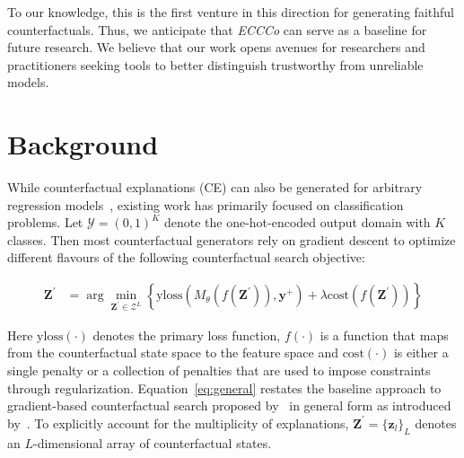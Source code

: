 To our knowledge, this is the first venture in this direction for generating faithful counterfactuals. Thus, we anticipate that \textit{ECCCo} can serve as a baseline for future research. We believe that our work opens avenues for researchers and practitioners seeking tools to better distinguish trustworthy from unreliable models.

\section{Background}\label{background}

While counterfactual explanations (CE) can also be generated for arbitrary regression models~\citep{spooner2021counterfactual}, existing work has primarily focused on classification problems. Let $\mathcal{Y}=(0,1)^K$ denote the one-hot-encoded output domain with $K$ classes. Then most counterfactual generators rely on gradient descent to optimize different flavours of the following counterfactual search objective:

\begin{equation} \label{eq:general}
\begin{aligned}
\mathbf{Z}^\prime &= \arg \min_{\mathbf{Z}^\prime \in \mathcal{Z}^L} \left\{  {\text{yloss}(M_{\theta}(f(\mathbf{Z}^\prime)),\mathbf{y}^+)}+ \lambda {\text{cost}(f(\mathbf{Z}^\prime)) }  \right\} 
\end{aligned} 
\end{equation}

Here $\text{yloss}(\cdot)$ denotes the primary loss function, $f(\cdot)$ is a function that maps from the counterfactual state space to the feature space and $\text{cost}(\cdot)$ is either a single penalty or a collection of penalties that are used to impose constraints through regularization. Equation~\ref{eq:general} restates the baseline approach to gradient-based counterfactual search proposed by~\citet{wachter2017counterfactual} in general form as introduced by~\citet{altmeyer2023endogenous}. To explicitly account for the multiplicity of explanations, $\mathbf{Z}^\prime=\{ \mathbf{z}_l\}_L$ denotes an $L$-dimensional array of counterfactual states. 

